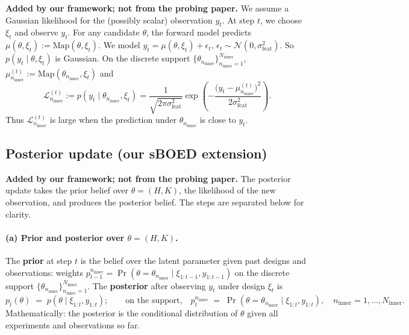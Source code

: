 \documentclass[10pt]{article}
\newcommand{\Map}{\mathrm{Map}}
\newcommand{\Ninner}{N_{\mathrm{inner}}}
\newcommand{\ninner}{n_{\mathrm{inner}}}
\begin{document}
\textbf{Added by our framework; not from the probing paper.} We assume a Gaussian likelihood for the (possibly scalar) observation $y_t$. At step $t$, we choose $\xi_t$ and observe $y_t$. For any candidate $\theta$, the forward model predicts $\mu(\theta,\xi_t):=\Map(\theta,\xi_t)$. We model $y_t=\mu(\theta,\xi_t)+\epsilon_t$, $\epsilon_t\sim\mathcal{N}(0,\sigma_{\mathrm{feat}}^2)$. So $p(y_t\mid\theta,\xi_t)$ is Gaussian. On the discrete support $\{\theta_{\ninner}\}_{\ninner=1}^{\Ninner}$, $\mu_{\ninner}^{(t)}:=\Map(\theta_{\ninner},\xi_t)$ and
\[
\mathcal{L}_{\ninner}^{(t)}
:=p(y_t\mid\theta_{\ninner},\xi_t)
=\frac{1}{\sqrt{2\pi\sigma_{\mathrm{feat}}^2}}
\exp\left(-\frac{\big(y_t-\mu_{\ninner}^{(t)}\big)^2}{2\sigma_{\mathrm{feat}}^2}\right).
\]
Thus $\mathcal{L}_{\ninner}^{(t)}$ is large when the prediction under $\theta_{\ninner}$ is close to $y_t$.

\subsection{Posterior update (our sBOED extension)}
\label{sec:posterior}

\textbf{Added by our framework; not from the probing paper.} The posterior update takes the prior belief over $\theta=(H,K)$, the likelihood of the new observation, and produces the posterior belief. The steps are separated below for clarity.

\paragraph{(a) Prior and posterior over $\theta=(H,K)$.}
The \textbf{prior} at step $t$ is the belief over the latent parameter given past designs and observations: weights $p_{t-1}^{\ninner}=\Pr(\theta=\theta_{\ninner}\mid\xi_{1:t-1},y_{1:t-1})$ on the discrete support $\{\theta_{\ninner}\}_{\ninner=1}^{\Ninner}$. The \textbf{posterior} after observing $y_t$ under design $\xi_t$ is
\begin{equation}
\label{eq:posterior}
p_t(\theta)\;=\;p(\theta\mid\xi_{1:t},y_{1:t});\qquad\text{on the support,}\quad p_t^{\ninner}\;=\;\Pr(\theta=\theta_{\ninner}\mid\xi_{1:t},y_{1:t}),\quad \ninner=1,\dots,\Ninner.
\end{equation}
Mathematically: the posterior is the conditional distribution of $\theta$ given all experiments and observations so far.
\end{document}

